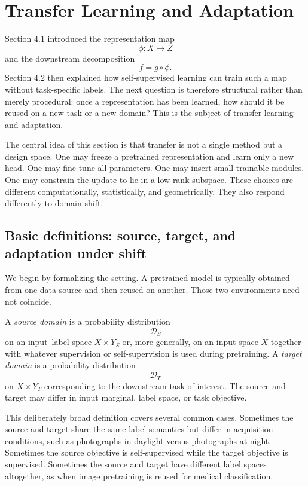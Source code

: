 \section{Transfer Learning and Adaptation}

Section 4.1 introduced the representation map
\[
\phi : X \to Z
\]
and the downstream decomposition
\[
f = g \circ \phi.
\]
Section 4.2 then explained how self-supervised learning can train such a map without task-specific labels.
The next question is therefore structural rather than merely procedural:
once a representation has been learned, how should it be reused on a new task or a new domain?
This is the subject of transfer learning and adaptation.

The central idea of this section is that transfer is not a single method but a design space.
One may freeze a pretrained representation and learn only a new head.
One may fine-tune all parameters.
One may insert small trainable modules.
One may constrain the update to lie in a low-rank subspace.
These choices are different computationally, statistically, and geometrically.
They also respond differently to domain shift.

\subsection*{Basic definitions: source, target, and adaptation under shift}

We begin by formalizing the setting.
A pretrained model is typically obtained from one data source and then reused on another.
Those two environments need not coincide.

\begin{definition}
A \emph{source domain} is a probability distribution
\[
\mathcal{D}_S
\]
on an input--label space $X \times Y_S$ or, more generally, on an input space $X$ together with whatever supervision or self-supervision is used during pretraining.
A \emph{target domain} is a probability distribution
\[
\mathcal{D}_T
\]
on $X \times Y_T$ corresponding to the downstream task of interest.
The source and target may differ in input marginal, label space, or task objective.
\end{definition}

This deliberately broad definition covers several common cases.
Sometimes the source and target share the same label semantics but differ in acquisition conditions, such as photographs in daylight versus photographs at night.
Sometimes the source objective is self-supervised while the target objective is supervised.
Sometimes the source and target have different label spaces altogether, as when image pretraining is reused for medical classification.

